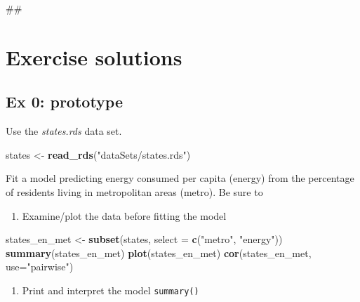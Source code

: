 \documentclass[]{book}
\newenvironment{Shaded}{\begin{snugshade}}{\end{snugshade}}
\newcommand{\KeywordTok}[1]{\textcolor[rgb]{0.13,0.29,0.53}{\textbf{#1}}}
\newcommand{\DataTypeTok}[1]{\textcolor[rgb]{0.13,0.29,0.53}{#1}}
\newcommand{\StringTok}[1]{\textcolor[rgb]{0.31,0.60,0.02}{#1}}
\newcommand{\NormalTok}[1]{#1}
\providecommand{\tightlist}{%
  \setlength{\itemsep}{0pt}\setlength{\parskip}{0pt}}
\begin{document}
\begin{Shaded}
\begin{Highlighting}[]
\NormalTok{## }
\end{Highlighting}
\end{Shaded}

\section{Exercise solutions}\label{exercise-solutions-1}

\subsection{Ex 0: prototype}\label{ex-0-prototype-1}

Use the \emph{states.rds} data set.

\begin{Shaded}
\begin{Highlighting}[]
\NormalTok{  states <-}\StringTok{ }\KeywordTok{read_rds}\NormalTok{(}\StringTok{"dataSets/states.rds"}\NormalTok{)}
\end{Highlighting}
\end{Shaded}

Fit a model predicting energy consumed per capita (energy) from the
percentage of residents living in metropolitan areas (metro). Be sure to

\begin{enumerate}
\def\labelenumi{\arabic{enumi}.}
\tightlist
\item
  Examine/plot the data before fitting the model
\end{enumerate}

\begin{Shaded}
\begin{Highlighting}[]
\NormalTok{  states_en_met <-}\StringTok{ }\KeywordTok{subset}\NormalTok{(states, }\DataTypeTok{select =} \KeywordTok{c}\NormalTok{(}\StringTok{"metro"}\NormalTok{, }\StringTok{"energy"}\NormalTok{))}
  \KeywordTok{summary}\NormalTok{(states_en_met)}
  \KeywordTok{plot}\NormalTok{(states_en_met)}
  \KeywordTok{cor}\NormalTok{(states_en_met, }\DataTypeTok{use=}\StringTok{"pairwise"}\NormalTok{)}
\end{Highlighting}
\end{Shaded}

\begin{enumerate}
\def\labelenumi{\arabic{enumi}.}
\setcounter{enumi}{1}
\tightlist
\item
  Print and interpret the model \texttt{summary()}
\end{enumerate}
\end{document}
